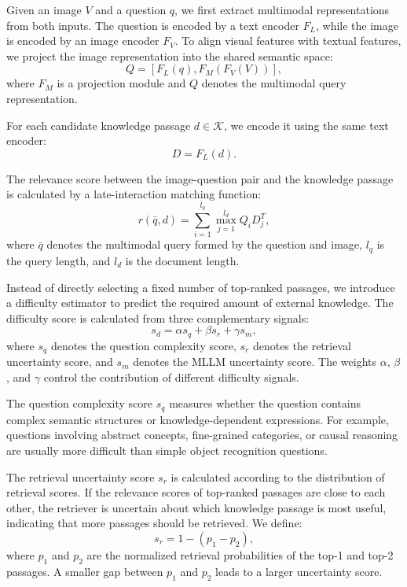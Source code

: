 \documentclass[manuscript,screen,review]{acmart}
\begin{document}
Given an image $V$ and a question $q$, we first extract multimodal representations from both inputs. The question is encoded by a text encoder $F_L$, while the image is encoded by an image encoder $F_V$. To align visual features with textual features, we project the image representation into the shared semantic space:
\begin{equation}
Q = [F_L(q), F_M(F_V(V))],
\end{equation}
where $F_M$ is a projection module and $Q$ denotes the multimodal query representation.

For each candidate knowledge passage $d \in \mathcal{K}$, we encode it using the same text encoder:
\begin{equation}
D = F_L(d).
\end{equation}

The relevance score between the image-question pair and the knowledge passage is calculated by a late-interaction matching function:
\begin{equation}
r(\bar{q}, d) = \sum_{i=1}^{l_q} \max_{j=1}^{l_d} Q_i D_j^{T},
\end{equation}
where $\bar{q}$ denotes the multimodal query formed by the question and image, $l_q$ is the query length, and $l_d$ is the document length.

Instead of directly selecting a fixed number of top-ranked passages, we introduce a difficulty estimator to predict the required amount of external knowledge. The difficulty score is calculated from three complementary signals:
\begin{equation}
s_d = \alpha s_q + \beta s_r + \gamma s_m,
\end{equation}
where $s_q$ denotes the question complexity score, $s_r$ denotes the retrieval uncertainty score, and $s_m$ denotes the MLLM uncertainty score. The weights $\alpha$, $\beta$, and $\gamma$ control the contribution of different difficulty signals.

The question complexity score $s_q$ measures whether the question contains complex semantic structures or knowledge-dependent expressions. For example, questions involving abstract concepts, fine-grained categories, or causal reasoning are usually more difficult than simple object recognition questions.

The retrieval uncertainty score $s_r$ is calculated according to the distribution of retrieval scores. If the relevance scores of top-ranked passages are close to each other, the retriever is uncertain about which knowledge passage is most useful, indicating that more passages should be retrieved. We define:
\begin{equation}
s_r = 1 - (p_1 - p_2),
\end{equation}
where $p_1$ and $p_2$ are the normalized retrieval probabilities of the top-1 and top-2 passages. A smaller gap between $p_1$ and $p_2$ leads to a larger uncertainty score.
\end{document}
